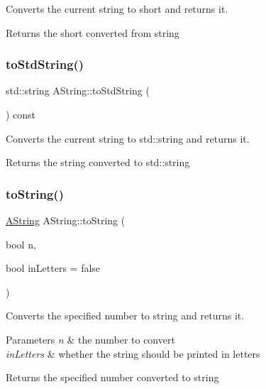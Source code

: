 Converts the current string to short and returns it. 

\begin{DoxyReturn}{Returns}
the short converted from string 
\end{DoxyReturn}
\mbox{\label{class_a_string_a4854e78fcc05431efb96eaa99e271fea}} 
\subsubsection{\texorpdfstring{toStdString()}{toStdString()}}
{\footnotesize\ttfamily std\+::string A\+String\+::to\+Std\+String (\begin{DoxyParamCaption}{ }\end{DoxyParamCaption}) const}



Converts the current string to std\+::string and returns it. 

\begin{DoxyReturn}{Returns}
the string converted to std\+::string 
\end{DoxyReturn}
\mbox{\label{class_a_string_a13ac330330d3f576a06e8ef3316ef293}} 
\subsubsection{\texorpdfstring{toString()}{toString()}\hspace{0.1cm}{\footnotesize\ttfamily [1/11]}}
{\footnotesize\ttfamily \mbox{\hyperlink{class_a_string}{A\+String}} A\+String\+::to\+String (\begin{DoxyParamCaption}\item[{bool}]{n,  }\item[{bool}]{in\+Letters = {\ttfamily false} }\end{DoxyParamCaption})\hspace{0.3cm}{\ttfamily [static]}}



Converts the specified number to string and returns it. 


\begin{DoxyParams}{Parameters}
{\em n} & the number to convert \\
\hline
{\em in\+Letters} & whether the string should be printed in letters \\
\hline
\end{DoxyParams}
\begin{DoxyReturn}{Returns}
the specified number converted to string 
\end{DoxyReturn}
\mbox{\label{class_a_string_a364c9570a8fc099dd09ce78ae8818dc7}} 
